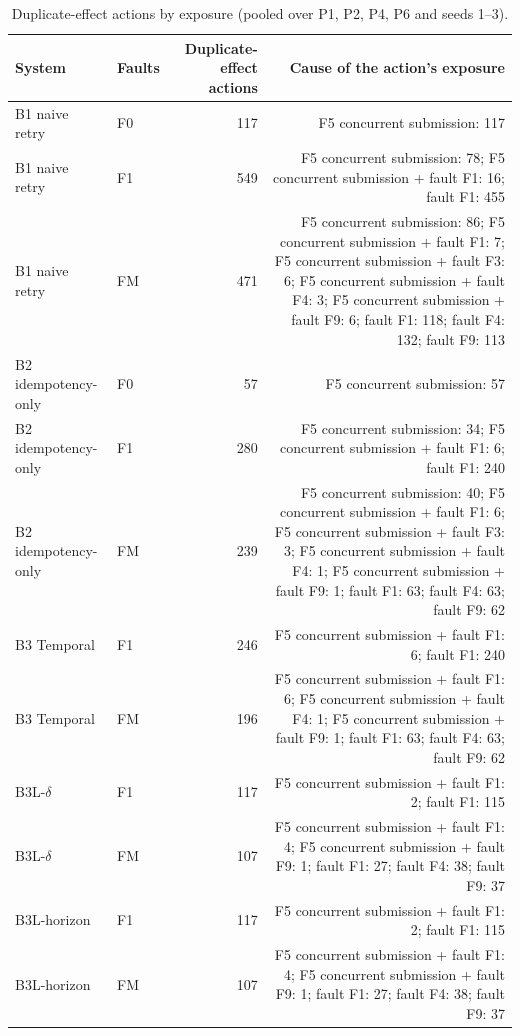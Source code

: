 \begin{table}[t]
\centering
\scriptsize
\caption{Duplicate-effect actions by exposure (pooled over P1, P2, P4, P6 and seeds 1--3).}
\label{tab:m7-dupcause}
\begin{tabular}{llrr}
\toprule
System & Faults & Duplicate-effect actions & Cause of the action's exposure \\
\midrule
B1 naive retry & F0 & 117 & F5 concurrent submission: 117 \\
B1 naive retry & F1 & 549 & F5 concurrent submission: 78; F5 concurrent submission + fault F1: 16; fault F1: 455 \\
B1 naive retry & FM & 471 & F5 concurrent submission: 86; F5 concurrent submission + fault F1: 7; F5 concurrent submission + fault F3: 6; F5 concurrent submission + fault F4: 3; F5 concurrent submission + fault F9: 6; fault F1: 118; fault F4: 132; fault F9: 113 \\
B2 idempotency-only & F0 & 57 & F5 concurrent submission: 57 \\
B2 idempotency-only & F1 & 280 & F5 concurrent submission: 34; F5 concurrent submission + fault F1: 6; fault F1: 240 \\
B2 idempotency-only & FM & 239 & F5 concurrent submission: 40; F5 concurrent submission + fault F1: 6; F5 concurrent submission + fault F3: 3; F5 concurrent submission + fault F4: 1; F5 concurrent submission + fault F9: 1; fault F1: 63; fault F4: 63; fault F9: 62 \\
B3 Temporal & F1 & 246 & F5 concurrent submission + fault F1: 6; fault F1: 240 \\
B3 Temporal & FM & 196 & F5 concurrent submission + fault F1: 6; F5 concurrent submission + fault F4: 1; F5 concurrent submission + fault F9: 1; fault F1: 63; fault F4: 63; fault F9: 62 \\
B3L-$\delta$ & F1 & 117 & F5 concurrent submission + fault F1: 2; fault F1: 115 \\
B3L-$\delta$ & FM & 107 & F5 concurrent submission + fault F1: 4; F5 concurrent submission + fault F9: 1; fault F1: 27; fault F4: 38; fault F9: 37 \\
B3L-horizon & F1 & 117 & F5 concurrent submission + fault F1: 2; fault F1: 115 \\
B3L-horizon & FM & 107 & F5 concurrent submission + fault F1: 4; F5 concurrent submission + fault F9: 1; fault F1: 27; fault F4: 38; fault F9: 37 \\
\bottomrule
\end{tabular}
\end{table}
